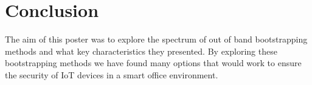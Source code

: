\section{Conclusion}

The aim of this poster was to explore the spectrum of out of band bootstrapping methods and what key characteristics they presented.
By exploring these bootstrapping methods we have found many options that would work to ensure the security of IoT devices in a smart office environment. 
